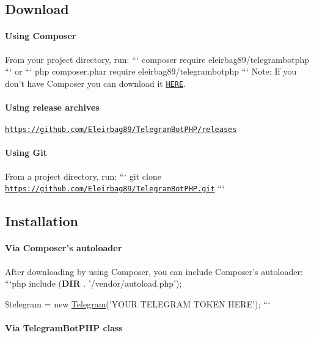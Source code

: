 \subsection*{Download }

\paragraph*{Using Composer}

From your project directory, run\-: ``` composer require eleirbag89/telegrambotphp ``` or ``` php composer.\-phar require eleirbag89/telegrambotphp ``` Note\-: If you don't have Composer you can download it \href{https://getcomposer.org/download/}{\tt H\-E\-R\-E}.

\paragraph*{Using release archives}

\href{https://github.com/Eleirbag89/TelegramBotPHP/releases}{\tt https\-://github.\-com/\-Eleirbag89/\-Telegram\-Bot\-P\-H\-P/releases}

\paragraph*{Using Git}

From a project directory, run\-: ``` git clone \href{https://github.com/Eleirbag89/TelegramBotPHP.git}{\tt https\-://github.\-com/\-Eleirbag89/\-Telegram\-Bot\-P\-H\-P.\-git} ```

\subsection*{Installation }

\paragraph*{Via Composer's autoloader}

After downloading by using Composer, you can include Composer's autoloader\-: ```php include ({\bfseries D\-I\-R} . '/vendor/autoload.php');

\$telegram = new \hyperlink{class_telegram}{Telegram}('Y\-O\-U\-R T\-E\-L\-E\-G\-R\-A\-M T\-O\-K\-E\-N H\-E\-R\-E'); ```

\paragraph*{Via Telegram\-Bot\-P\-H\-P class}

